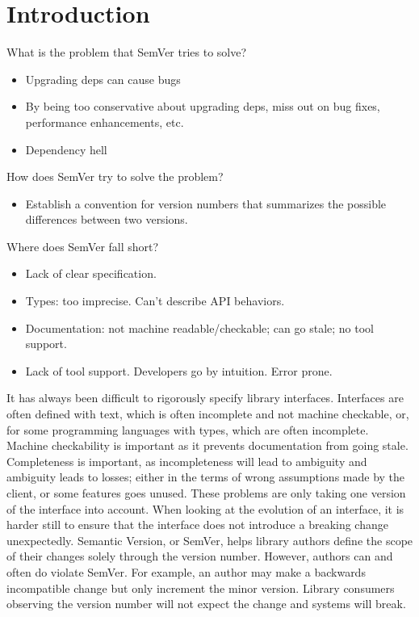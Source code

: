 \section{Introduction}

What is the problem that SemVer tries to solve? 
\begin{itemize}
\item Upgrading deps can cause bugs
\item By being too conservative about upgrading deps, miss out on
  bug fixes, performance enhancements, etc.
\item Dependency hell
\end{itemize}

How does SemVer try to solve the problem?
\begin{itemize}
\item Establish a convention for version numbers that summarizes
  the possible differences between two versions.
\end{itemize}

Where does SemVer fall short? 
\begin{itemize}
\item Lack of clear specification. 
\item Types: too imprecise. Can't describe API behaviors.
\item Documentation: not machine readable/checkable; can go stale; no tool support.
\item Lack of tool support. Developers go by intuition. Error prone.
\end{itemize}



It has always been difficult to rigorously specify library interfaces.
Interfaces are often defined with text, which is often incomplete and not
machine checkable, or, for some programming languages with types, which are
often incomplete. Machine checkability is important as it prevents
documentation from going stale. Completeness is important, as incompleteness
will lead to ambiguity and ambiguity leads to losses; either in the terms of
wrong assumptions made by the client, or some features goes unused. These
problems are only taking one version of the interface into account. When
looking at the evolution of an interface, it is harder still to ensure that the
interface does not introduce a breaking change unexpectedly. Semantic Version, or
SemVer, helps library authors define the scope of their changes solely through
the version number. However, authors can and often do violate SemVer. For
example, an author may make a backwards incompatible change but only increment
the minor version. Library consumers observing the version number will not
expect the change and systems will break. 


